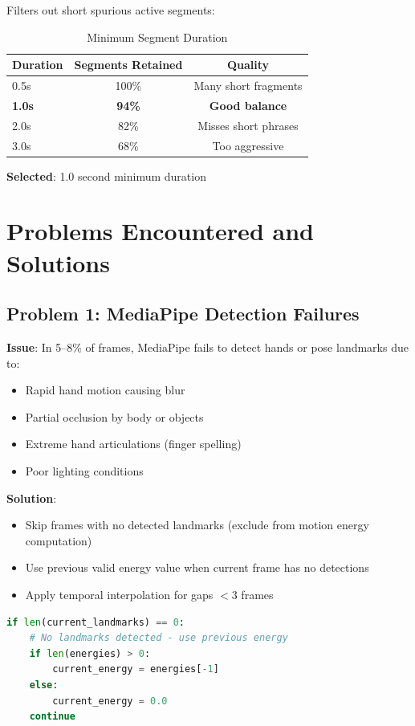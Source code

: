 \documentclass[11pt,a4paper]{article}
\begin{document}
Filters out short spurious active segments:

\begin{table}[htbp]
\centering
\caption{Minimum Segment Duration}
\begin{tabular}{@{}lcc@{}}
\toprule
\textbf{Duration} & \textbf{Segments Retained} & \textbf{Quality} \\ \midrule
0.5s & 100\% & Many short fragments \\
\textbf{1.0s} & \textbf{94\%} & \textbf{Good balance} \\
2.0s & 82\% & Misses short phrases \\
3.0s & 68\% & Too aggressive \\
\bottomrule
\end{tabular}
\end{table}

\textbf{Selected}: 1.0 second minimum duration

\section{Problems Encountered and Solutions}

\subsection{Problem 1: MediaPipe Detection Failures}

\textbf{Issue}: In 5--8\% of frames, MediaPipe fails to detect hands or pose landmarks due to:
\begin{itemize}
    \item Rapid hand motion causing blur
    \item Partial occlusion by body or objects
    \item Extreme hand articulations (finger spelling)
    \item Poor lighting conditions
\end{itemize}

\textbf{Solution}: 
\begin{itemize}
    \item Skip frames with no detected landmarks (exclude from motion energy computation)
    \item Use previous valid energy value when current frame has no detections
    \item Apply temporal interpolation for gaps $<3$ frames
\end{itemize}

\begin{lstlisting}[language=Python]
if len(current_landmarks) == 0:
    # No landmarks detected - use previous energy
    if len(energies) > 0:
        current_energy = energies[-1]
    else:
        current_energy = 0.0
    continue
\end{lstlisting}
\end{document}
